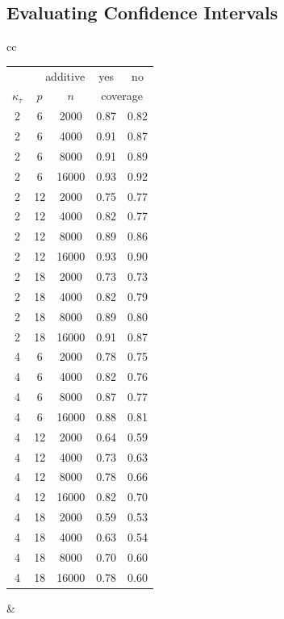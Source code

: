 \documentclass[aos]{imsart}
\theoremstyle{plain}
\theoremstyle{definition}
\theoremstyle{remark}
\begin{document}
\begin{CJK}{UTF8}{gbsn}
{\begin{appendix}
\subsection{Evaluating Confidence Intervals}

\begin{table}[t]
\centering
\begin{tabular}{cc}
\begin{tabular}{|ccc|cc|}
\hline
\multicolumn{3}{|r|}{additive} & yes & no \\
$\kappa_\tau$ & $p$ & $n$ & \multicolumn{2}{c|}{coverage} \\ 
  \hline
\hline
2 & 6 & 2000 & 0.87 & 0.82 \\ 
  2 & 6 & 4000 & 0.91 & 0.87 \\ 
  2 & 6 & 8000 & 0.91 & 0.89 \\ 
  2 & 6 & 16000 & 0.93 & 0.92 \\ 
   \hline
2 & 12 & 2000 & 0.75 & 0.77 \\ 
  2 & 12 & 4000 & 0.82 & 0.77 \\ 
  2 & 12 & 8000 & 0.89 & 0.86 \\ 
  2 & 12 & 16000 & 0.93 & 0.90 \\ 
   \hline
2 & 18 & 2000 & 0.73 & 0.73 \\ 
  2 & 18 & 4000 & 0.82 & 0.79 \\ 
  2 & 18 & 8000 & 0.89 & 0.80 \\ 
  2 & 18 & 16000 & 0.91 & 0.87 \\ 
   \hline
\hline
4 & 6 & 2000 & 0.78 & 0.75 \\ 
  4 & 6 & 4000 & 0.82 & 0.76 \\ 
  4 & 6 & 8000 & 0.87 & 0.77 \\ 
  4 & 6 & 16000 & 0.88 & 0.81 \\ 
   \hline
4 & 12 & 2000 & 0.64 & 0.59 \\ 
  4 & 12 & 4000 & 0.73 & 0.63 \\ 
  4 & 12 & 8000 & 0.78 & 0.66 \\ 
  4 & 12 & 16000 & 0.82 & 0.70 \\ 
   \hline
4 & 18 & 2000 & 0.59 & 0.53 \\ 
  4 & 18 & 4000 & 0.63 & 0.54 \\ 
  4 & 18 & 8000 & 0.70 & 0.60 \\ 
  4 & 18 & 16000 & 0.78 & 0.60 \\  
   \hline
\end{tabular}
&
\begin{tabular}{|ccc|cc|}

\end{tabular}
\end{tabular}
\end{table}
\end{appendix}}
\end{CJK}
\end{document}
